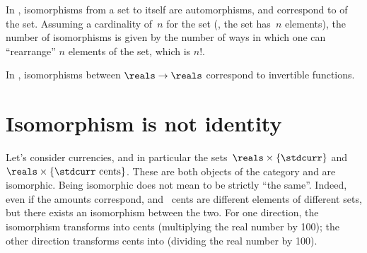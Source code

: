 \begin{example}
In \FinSet, isomorphisms from a set to itself are automorphisms, and correspond to \emph{} of the set. Assuming a cardinality of~$n$ for the set (\ie , the set has~$n$ elements), the number of isomorphisms is given by the number of ways in which one can ``rearrange'' $n$ elements of the set, which is $n!$.
\end{example}

\begin{example}
In \Set, isomorphisms between $\reals\to \reals$ correspond to invertible functions.
\end{example}


\section{Isomorphism is not identity}
\begin{example}
Let's consider currencies, and in particular the sets~$\reals\times \{\stdcurr\}$ and~$\reals\times \{\stdcurr \text{ cents}\}$. These are both objects of the category \Curr and are isomorphic. Being isomorphic does not mean to be strictly ``the same''. Indeed, even if the amounts correspond, \unit[10]{\stdcurr} and \unit[1,000]{\stdcurr cents} are different elements of different sets, but there exists an isomorphism between the two. For one direction, the isomorphism transforms \stdcurr into \stdcurr cents (multiplying the real number by 100); the other direction transforms \stdcurr cents into \stdcurr (dividing the real number by 100).
\end{example}










